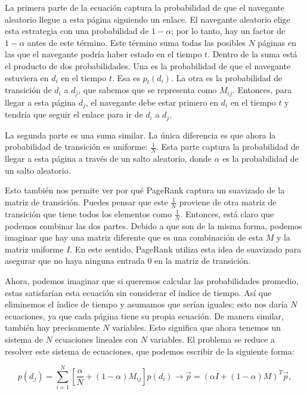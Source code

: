 La primera parte de la ecuación captura la probabilidad de que el navegante aleatorio llegue a esta página siguiendo un enlace. El navegante aleatorio elige esta estrategia con una probabilidad de \(1 - \alpha\); por lo tanto, hay un factor de \(1 - \alpha\) antes de este término. Este término suma todas las posibles \(N\) páginas en las que el navegante podría haber estado en el tiempo \(t\). Dentro de la suma está el producto de dos probabilidades. Una es la probabilidad de que el navegante estuviera en \(d_i\) en el tiempo \(t\). Esa es \(p_t(d_i)\). La otra es la probabilidad de transición de \(d_i\) a \(d_j\), que sabemos que se representa como \(M_{ij}\). Entonces, para llegar a esta página \(d_j\), el navegante debe estar primero en \(d_i\) en el tiempo \(t\) y tendría que seguir el enlace para ir de \(d_i\) a \(d_j\).

La segunda parte es una suma similar. La única diferencia es que ahora la probabilidad de transición es uniforme: \(\frac{1}{N}\). Esta parte captura la probabilidad de llegar a esta página a través de un salto aleatorio, donde \(\alpha\) es la probabilidad de un salto aleatorio.

Esto también nos permite ver por qué PageRank captura un suavizado de la matriz de transición. Puedes pensar que este \(\frac{1}{N}\) proviene de otra matriz de transición que tiene todos los elementos como \(\frac{1}{N}\). Entonces, está claro que podemos combinar las dos partes. Debido a que son de la misma forma, podemos imaginar que hay una matriz diferente que es una combinación de esta \(M\) y la matriz uniforme \(I\). En este sentido, PageRank utiliza esta idea de suavizado para asegurar que no haya ninguna entrada 0 en la matriz de transición.

Ahora, podemos imaginar que si queremos calcular las probabilidades promedio, estas satisfarían esta ecuación sin considerar el índice de tiempo. Así que eliminemos el índice de tiempo y asumamos que serían iguales; esto nos daría \(N\) ecuaciones, ya que cada página tiene su propia ecuación. De manera similar, también hay precisamente \(N\) variables. Esto significa que ahora tenemos un sistema de \(N\) ecuaciones lineales con \(N\) variables. El problema se reduce a resolver este sistema de ecuaciones, que podemos escribir de la siguiente forma:

\begin{equation}
p (d_j) = \sum_{i = 1}^N \left[\frac{\alpha}{N} + (1 - \alpha)M_{ij}\right] p (d_i) \rightarrow \vec{p} = (\alpha I + (1 - \alpha)M)^T \vec{p}, 
\end{equation}

